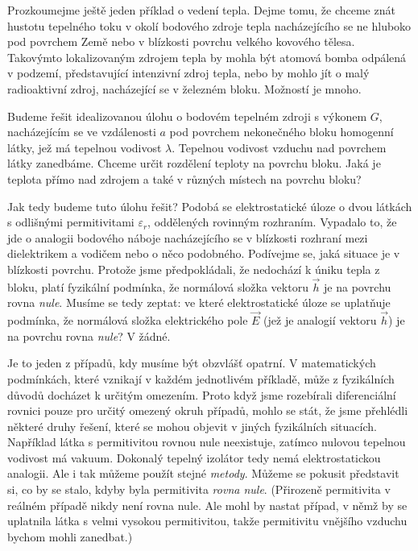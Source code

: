     Prozkoumejme ještě jeden příklad o vedení tepla. Dejme tomu, že chceme znát hustotu tepelného
    toku v okolí bodového zdroje tepla nacházejícího se ne hluboko pod povrchem Země nebo v
    blízkosti povrchu velkého kovového tělesa. Takovýmto lokalizovaným zdrojem tepla by mohla být
    atomová bomba odpálená v podzemí, představující intenzivní zdroj tepla, nebo by mohlo jít o malý
    radioaktivní zdroj, nacházející se v železném bloku. Možností je mnoho.

    Budeme řešit idealizovanou úlohu o bodovém tepelném zdroji s výkonem \(G\), nacházejícím se ve
    vzdálenosti \(a\) pod povrchem nekonečného bloku homogenní látky, jež má tepelnou vodivost
    \(\lambda\). Tepelnou vodivost vzduchu nad povrchem látky zanedbáme. Chceme určit rozdělení
    teploty na povrchu bloku. Jaká je teplota přímo nad zdrojem a také v různých místech na povrchu
    bloku?

    Jak tedy budeme tuto úlohu řešit? Podobá se elektrostatické úloze o dvou látkách s odlišnými
    permitivitami \(\varepsilon_r\), oddělených rovinným rozhraním. Vypadalo to, že jde o analogii
    bodového náboje nacházejícího se v blízkosti rozhraní mezi dielektrikem a vodičem nebo o něco
    podobné­ho. Podívejme se, jaká situace je v blízkosti povrchu. Protože jsme předpokládali, že
    nedochází k úniku tepla z bloku, platí fyzikální podmínka, že normálová složka vektoru
    \(\vec{h}\) je na povrchu rovna \emph{nule}. Musíme se tedy zeptat: ve které elektrostatické
    úloze se uplatňuje podmínka, že normálová složka elektrického pole \(\vec{E}\) (jež je analogií
    vektoru \(\vec{h}\)) je na povrchu rovna \emph{nule}? V žádné.

    Je to jeden z případů, kdy musíme být obzvlášť opatrní. V matematických podmínkách, které
    vznikají v každém jednotlivém příkladě, může z fyzikálních důvodů docházet k určitým omezením.
    Proto když jsme rozebírali diferenciální rovnici pouze pro určitý omezený okruh případů, mohlo
    se stát, že jsme přehlédli některé druhy řešení, které se mohou objevit v jiných fyzikálních
    situacích. Například látka s permitivitou rovnou nule neexistuje, zatímco nulovou tepelnou
    vodi­vost má vakuum. Dokonalý tepelný izolátor tedy nemá elektrostatickou analogii. Ale i tak
    můžeme použít stejné \emph{metody}. Můžeme se pokusit představit si, co by se stalo, kdyby byla
    permitivita \emph{rovna nule}. (Přirozeně permitivita v reálném případě nikdy není rovna nule.
    Ale mohl by nastat případ, v němž by se uplatnila látka s velmi vysokou permitivitou, takže
    permitivitu vnějšího vzduchu bychom mohli zanedbat.)


